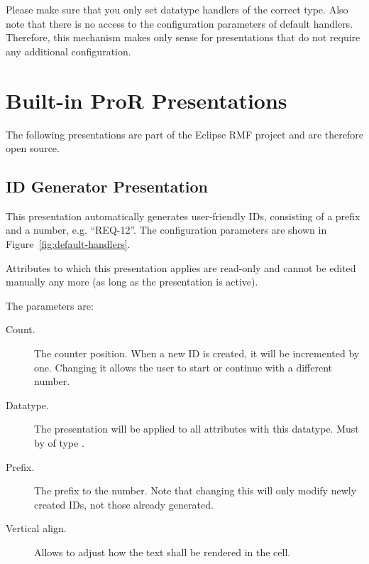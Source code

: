 \begin{warning}
Please make sure that you only set datatype handlers of the correct type.  Also note that there is no access to the configuration parameters of default handlers. Therefore, this mechanism makes only sense for presentations that do not require any additional configuration.
\end{warning}

\section{Built-in ProR Presentations}

The following presentations are part of the Eclipse RMF project and are therefore open source.

\subsection{ID Generator Presentation}
\label{sec:id_presentation}

This presentation automatically generates user-friendly IDs, consisting of a prefix and a number, e.g. ``REQ-12''. The configuration parameters are shown in Figure~\ref{fig:default-handlers}.

\begin{info}
Attributes to which this presentation applies are read-only and cannot be edited manually any more (as long as the presentation is active).
\end{info}

The parameters are:

\begin{description}
\item[Count.] The counter position. When a new ID is created, it will be incremented by one.  Changing it allows  the user to start or continue with a different number.
\item[Datatype.] The presentation will be applied to all attributes with this datatype.  Must by of type .
\item[Prefix.] The prefix to the number.  Note that changing this will only modify newly created IDs, not those already generated.
\item[Vertical align.] Allows to adjust how the text shall be rendered in the cell.
\end{description}

